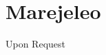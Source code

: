\documentclass[11pt,a4paper,sans,swahili]{moderncv}
\begin{document}
	\section{Marejeleo}
	Upon Request
		\begin{comment}
	\begin{center}
		\begin{tabular}{p{6cm}p{8cm}}
			\textbf{Jina:} & Dr. Mundia S.M, Mhadhiri\\
			\textbf{Nafasi:} & Mratibu wa Miradi\\
			\textbf{Kampuni:} & Chuo Kikuu cha Teknolojia cha Dedan Kimathi \\
			\textbf{Mawasiliano:} & +254 721 302 869\\
			\textbf{Barua Pepe:} & simon.maina@dkut.ac.ke \\
			\\
			\textbf{Jina:} & Dr. Omari Cyprian \\
			\textbf{Nafasi:} & Mwenyekiti \\
			\textbf{Kampuni:} & Shahada ya Sayansi ya Takwimu na Sayansi ya Bima, Chuo Kikuu cha Teknolojia cha Dedan Kimathi \\
			\textbf{Mawasiliano:} & +254 722 616 725 \\
			\textbf{Barua Pepe:} & cyomari@dkut.ac.ke \\
			\\
			\textbf{Jina:} & Julius Miheso \\
			\textbf{Nafasi:} & Mkaguzi wa Ndani \\
			\textbf{Kampuni:} & NSSF \\
			\textbf{Mawasiliano:} & +254 720 652 682 \\
			\textbf{Barua Pepe:} & atsiaya80@gmail.com \\
			\\
			\textbf{Jina:} & Gideon Ngome \\
			\textbf{Nafasi:} & Meneja wa Hatari \\
			\textbf{Kampuni:} & NSSF \\
			\textbf{Mawasiliano:} & +254 746 595 822 \\
			\textbf{Barua Pepe:} & ngomegideon@yahoo.com \\
		\end{tabular}
	\end{center}
	\end{comment}
\end{document}
